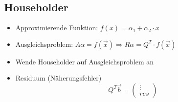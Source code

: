 \subsection{Householder}
\begin{itemize}
	
	\item Approximierende Funktion: $f(x) = \alpha_1 + \alpha_2 \cdot x$
	
	\item Ausgleichsproblem: $A\alpha = f(\vec{x}) \Rightarrow R\alpha = Q^T \cdot f(\vec{x})$
	
	\item Wende Householder auf Ausgleichsproblem an
	
	\item Residuum (Näherungsfehler)
	\begin{displaymath}
		Q^T\vec{b} = 
		\begin{pmatrix}
			\vdots \\
			res
		\end{pmatrix}
	\end{displaymath}

\end{itemize}